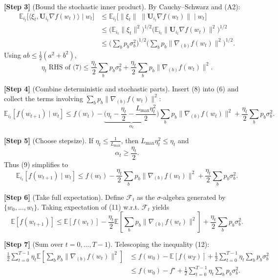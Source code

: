 \documentclass{article}
\newcommand{\E}{\mathbb{E}}
\begin{document}
\noindent\textbf{[Step 3]} (Bound the stochastic inner product).  
By Cauchy–Schwarz and (A2):
\[
\begin{aligned}
\E_{i_t}\big[\langle\xi_t,\mathbf{U}_{i_t}\nabla f(w_t)\rangle\mid w_t\big]
&\le \E_{i_t}\!\big[\|\xi_t\|\;\|\mathbf{U}_{i_t}\nabla f(w_t)\|\mid w_t\big]\\
&\le \Big(\E_{i_t}\|\xi_t\|^{2}\Big)^{1/2}
      \Big(\E_{i_t}\|\mathbf{U}_{i_t}\nabla f(w_t)\|^{2}\Big)^{1/2}\\
&\le \Big(\sum_{b}p_b\sigma_b^{2}\Big)^{1/2}
      \Big(\sum_{b}p_b\|\nabla_{(b)}f(w_t)\|^{2}\Big)^{1/2}.
\end{aligned}
\tag{7}
\]
Using $ab\le\frac{1}{2}(a^{2}+b^{2})$,
\[
\eta_t\;\text{RHS of (7)}\le
\frac{\eta_t}{2}\sum_{b}p_b\sigma_b^{2}
+\frac{\eta_t}{2}\sum_{b}p_b\|\nabla_{(b)}f(w_t)\|^{2}.
\tag{8}
\]

\noindent\textbf{[Step 4]} (Combine deterministic and stochastic parts).  
Insert (8) into (6) and collect the terms involving $\sum_{b}p_b\|\nabla_{(b)}f(w_t)\|^{2}$:
\[
\E_{i_t}[f(w_{t+1})\mid w_t]
\le f(w_t)
-\underbrace{\Big(\eta_t-\frac{\eta_t}{2}
-\frac{L_{\max}\eta_t^{2}}{2}\Big)}_{\displaystyle\alpha_t}
\sum_{b}p_b\|\nabla_{(b)}f(w_t)\|^{2}
+\frac{\eta_t}{2}\sum_{b}p_b\sigma_b^{2}.
\tag{9}
\]

\noindent\textbf{[Step 5]} (Choose stepsize).  
If $\eta_t\le\frac{1}{L_{\max}}$, then $L_{\max}\eta_t^{2}\le\eta_t$ and
\[
\alpha_t\ge\frac{\eta_t}{2}.
\tag{10}
\]
Thus (9) simplifies to
\[
\E_{i_t}[f(w_{t+1})\mid w_t]
\le f(w_t)-\frac{\eta_t}{2}\sum_{b}p_b\|\nabla_{(b)}f(w_t)\|^{2}
+\frac{\eta_t}{2}\sum_{b}p_b\sigma_b^{2}.
\tag{11}
\]

\noindent\textbf{[Step 6]} (Take full expectation).  
Define $\mathcal{F}_t$ as the $\sigma$‑algebra generated by $\{w_0,\dots ,w_t\}$.
Taking expectation of (11) w.r.t. $\mathcal{F}_t$ yields
\[
\E[f(w_{t+1})]\le \E[f(w_t)]-\frac{\eta_t}{2}\E\!\left[\sum_{b}p_b\|\nabla_{(b)}f(w_t)\|^{2}\right]
+\frac{\eta_t}{2}\sum_{b}p_b\sigma_b^{2}.
\tag{12}
\]

\noindent\textbf{[Step 7]} (Sum over $t=0,\dots ,T-1$).  
Telescoping the inequality (12):
\[
\begin{aligned}
\frac{1}{2}\sum_{t=0}^{T-1}\eta_t
\E\!\left[\sum_{b}p_b\|\nabla_{(b)}f(w_t)\|^{2}\right]
&\le f(w_0)-\E[f(w_T)]+\frac{1}{2}\sum_{t=0}^{T-1}\eta_t\sum_{b}p_b\sigma_b^{2}\\
&\le f(w_0)-f^\star
+\frac{1}{2}\sum_{t=0}^{T-1}\eta_t\sum_{b}p_b\sigma_b^{2}.
\end{aligned}
\tag{13}
\]
\end{document}
